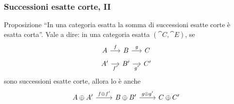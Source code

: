 \documentclass{beamer}
\begin{document}
\begin{frame}[fragile]
  \frametitle{Successioni esatte corte, II}

  \begin{block}{Proposizione}
    ``In una categoria esatta la somma di successioni esatte corte è
    esatta corta''. Vale a dire: in una categoria esatta
    \((\cat C,\cat E)\), se
    \[
      \begin{tikzcd}[row sep=tiny, column sep=small]
        A \ar["{f}", r] & B \ar["{g}", r] & C \\
        A' \ar["{f'}", r, swap] & B' \ar["{g'}", r, swap] & C'
      \end{tikzcd}
    \]
    sono successioni esatte corte, allora lo è anche
    \[
      \begin{tikzcd}[row sep=small]
        A \oplus A' \ar["{f \oplus f'}", r] & B \oplus B' \ar["{g \oplus
          g'}", r] & C \oplus C'
      \end{tikzcd}
    \]
  \end{block}
  
\end{frame}
\end{document}
